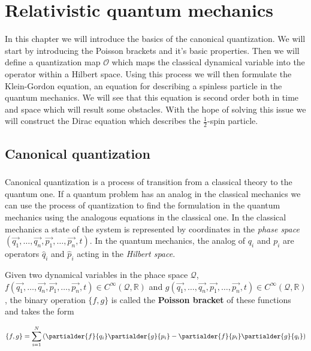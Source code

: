 \chapter{Relativistic quantum mechanics}

In this chapter we will introduce the basics of the canonical quantization. We will start by introducing the
Poisson brackets and it's basic properties. Then we will define a quantization map $\mathcal{O}$ which maps the
classical dynamical variable into the operator within a Hilbert space. Using this process we will then
formulate the Klein-Gordon equation, an equation for describing a spinless particle in the quantum mechanics.
We will see that this equation is second order both in time and space which will result some obstacles. With the
hope of solving this issue we will construct the Dirac equation which describes the $\frac{1}{2}$-spin particle.

\section{Canonical quantization}

\paragraph{} Canonical quantization is a process of transition from a classical theory to the quantum one. If a 
quantum problem has an analog in the classical mechanics we can use the process of quantization to find the formulation
in the quantum mechanics using the analogous equations in the classical one. In the classical mechanics a state of the system
is represented by coordinates in the \textit{phase space} $(\vec{q_{1}}, \dots, \vec{q_{n}}, \vec{p_{1}}, \dots, \vec{p_{n}}, t)$.
In the quantum mechanics, the analog of $q_{i}$ and $p_{i}$ are operators $\hat{q}_{i}$ and $\hat{p}_{i}$ acting in the 
\textit{Hilbert space}.

\begin{definition}
    \label{df:poisson}
    Given two dynamical variables in the phace space $\mathcal{Q}$, \newline $f(\vec{q_{1}}, \dots, \vec{q_{n}}, \vec{p_{1}}, \dots, \vec{p_{n}}, t) 
    \in C^{\infty}(\mathcal{Q}, \mathbb{R})$ and $g(\vec{q_{1}}, \dots, \vec{q_{n}}, \vec{p_{1}}, \dots, \vec{p_{n}}, t) 
    \in C^{\infty}(\mathcal{Q}, \mathbb{R})$, the binary operation $\{f, g\}$ is called the \textbf{Poisson bracket} of these functions and takes the form

    \begin{equation}
        \{f, g\} = \sum_{i=1}^{N}\left(\partialder{f}{q_{i}} \partialder{g}{p_{i}} - \partialder{f}{p_{i}} \partialder{g}{q_{i}}\right)
    \end{equation}
\end{definition}


